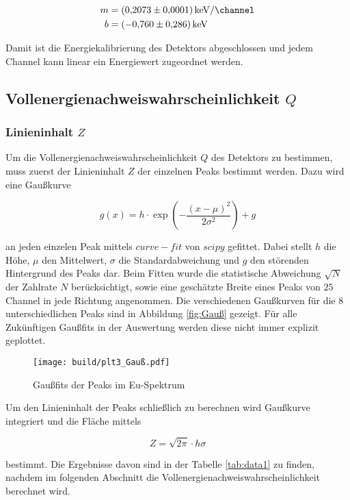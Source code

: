 \begin{align*}
	m & =\qty[per-mode=fraction]{0.2073(0.0001)}{\kilo\eV\per\channel} \\
	b & =\qty{-0.760(0.286)}{\kilo\eV}
\end{align*}

Damit ist die Energiekalibrierung des Detektors abgeschlossen und jedem Channel
kann linear ein Energiewert zugeordnet werden.

\subsection{Vollenergienachweiswahrscheinlichkeit $Q$}
\subsubsection{Linieninhalt $Z$}
Um die Vollenergienachweiswahrscheinlichkeit $Q$ des Detektors zu bestimmen,
muss zuerst der Linieninhalt $Z$ der einzelnen Peaks bestimmt werden. Dazu wird
eine Gaußkurve

\begin{equation}
	g(x)=h\cdot \exp(-\frac{(x-\mu )^2}{2\sigma^2})+g
	\label{eq:Gauß}
\end{equation}

an jeden einzelen Peak mittels $curve-fit$ von $scipy$ \cite{scipy} gefittet.
Dabei stellt $h$ die Höhe, $\mu$ den Mittelwert, $\sigma$ die
Standardabweichung und $g$ den störenden Hintergrund des Peaks dar. Beim Fitten
wurde die statistische Abweichung $\sqrt{N}$ der Zahlrate $N$ berücksichtigt,
sowie eine geschätzte Breite eines Peaks von $25$ Channel in jede Richtung
angenommen. Die verschiedenen Gaußkurven für die 8 unterschiedlichen Peaks sind
in Abbildung \eqref{fig:Gauß} gezeigt. Für alle Zukünftigen Gaußfits in der
Auswertung werden diese nicht immer explizit geplottet.

\begin{figure}
	\centering
	\texttt{[image: build/plt3\_Gauß.pdf]}
	\caption{Gaußfits der Peaks im Eu-Spektrum}
	\label{fig:Gauß}
\end{figure}

Um den Linieninhalt der Peaks schließlich zu berechnen wird Gaußkurve
integriert und die Fläche mittels

\begin{equation}
	Z=\sqrt{2\pi}\cdot h\sigma
	\label{eq:Z}
\end{equation}

bestimmt. Die Ergebnisse davon sind in der Tabelle \ref{tab:data1} zu finden,
nachdem im folgenden Abschnitt die Vollenergienachweiswahrscheinlichkeit
berechnet wird.

